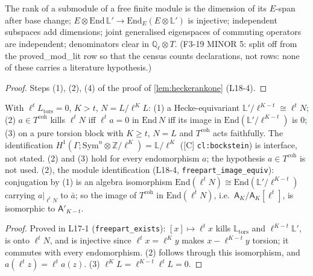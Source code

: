 \begin{lemma}\label{lem:heckerankone-aux}
  \leanok
  The rank of a submodule of a free finite module is the dimension of its $E$-span after base change; $E\otimes\mathrm{End}\,\mathbb L'\to
  \mathrm{End}_E(E\otimes\mathbb L')$ is injective; independent subspaces add dimensions; joint generalised eigenspaces of commuting
  operators are independent; denominators clear in $\mathbb Q_\ell\otimes T$. (F3-19 MINOR 5: split off from the \textsf{proved\_mod\_lit} row so that the census counts declarations, not rows: none of these carries a literature hypothesis.)
\end{lemma}
\begin{proof}
  \leanok
  Steps (1), (2), (4) of the proof of \ref{lem:heckerankone} (L18-4).
\end{proof}

\begin{lemma}\label{lem:freepart}
  \leanok
  With $\ell^tL_{\mathrm{tors}}=0$, $K>t$, $N=L/\ell^KL$: (1) a Hecke-equivariant $\mathbb L'/\ell^{K-t}\cong\ell^tN$; (2) $a\in T^{\mathrm{coh}}$
  kills $\ell^tN$ iff $\ell^ta=0$ in $\mathrm{End}\,N$ iff its image in $\mathrm{End}(\mathbb L'/\ell^{K-t})$ is $0$; (3) on a pure
  torsion block with $K\ge t$, $N=L$ and $T^{\mathrm{coh}}$ acts faithfully. The identification
  $H^1(\Gamma;\mathrm{Sym}^n\otimes\mathbb Z/\ell^K)=\mathbb L/\ell^K$ ([C] \texttt{cl:bockstein}) is interface, not stated.
  (2) and (3) hold for every endomorphism $a$; the hypothesis $a\in T^{\mathrm{coh}}$ is not used. (2), the module identification
  (L18-4, \texttt{freepart\_image\_equiv}): conjugation by (1) is an algebra isomorphism
  $\mathrm{End}(\ell^tN)\cong\mathrm{End}(\mathbb L'/\ell^{K-t})$ carrying $a|_{\ell^tN}$ to $\bar a$; so the image of $T^{\mathrm{coh}}$ in
  $\mathrm{End}(\ell^tN)$, i.e.\ $\mathsf A_K/\mathsf A_K[\ell^t]$, is isomorphic to $\mathsf A'_{K-t}$.
\end{lemma}
\begin{proof}
  \leanok
  Proved in L17-1 (\texttt{freepart\_exists}): $[x]\mapsto\ell^tx$ kills $\mathbb L_{\mathrm{tors}}$ and $\ell^{K-t}\mathbb L'$, is onto
  $\ell^tN$, and is injective since $\ell^tx=\ell^Ky$ makes $x-\ell^{K-t}y$ torsion; it commutes with every endomorphism. (2) follows
  through this isomorphism, and $a(\ell^tz)=\ell^ta(z)$. (3) $\ell^KL=\ell^{K-t}\ell^tL=0$.
\end{proof}

